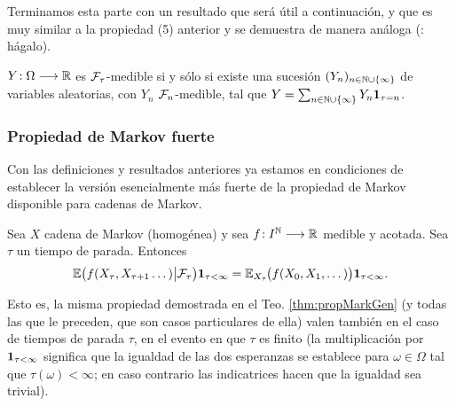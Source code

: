Terminamos esta parte con un resultado que será útil a continuación, y que es muy similar a la propiedad (5) anterior y se demuestra de manera análoga (\uexers: hágalo).

\begin{lem}\label{lem:Ymed}
$Y\!:\Omega\longrightarrow\mathbb{R}$ es $\mathcal{F}_\tau$-medible si y sólo si existe una sucesión $(Y_n)_{n\in\mathbb{N}\cup\{\infty\}}$ de variables aleatorias, con $Y_n$ $\mathcal{F}_n$-medible, tal que $Y=\sum_{n\in\mathbb{N}\cup\{\infty\}}Y_n\mathbf{1}_{\tau=n}$.
\end{lem}

\subsubsection{Propiedad de Markov fuerte}

Con las definiciones y resultados anteriores ya estamos en condiciones de establecer la versión esencialmente más fuerte de la propiedad de Markov disponible para cadenas de Markov.

\begin{thm}
Sea $X$ cadena de Markov (homogénea) y sea $f\!:I^{\mathbb{N}}\longrightarrow\mathbb{R}$ medible y acotada.
Sea $\tau$ un tiempo de parada.
Entonces
\begin{equation}
\mathbb{E}\big(f(X_{\tau},X_{\tau+1}\dotsc)\big|\mathcal{F}_\tau\big)\mathbf{1}_{\tau<\infty}=\mathbb{E}_{X_\tau}\hspace{-0.1em}\big(f(X_0,X_1,\dotsc)\big)\mathbf{1}_{\tau<\infty}.\label{eq:propMarkF}
\end{equation}
\end{thm}

Esto es, la misma propiedad demostrada en el Teo. \ref{thm:propMarkGen} (y todas las que le preceden, que son casos particulares de ella) valen también en el caso de tiempos de parada $\tau$, en el evento en que $\tau$ es finito (la multiplicación por $\mathbf{1}_{\tau<\infty}$ significa que la igualdad de las dos esperanzas se establece para $\omega\in\Omega$ tal que $\tau(\omega)<\infty$; en caso contrario las indicatrices hacen que la igualdad sea trivial).

